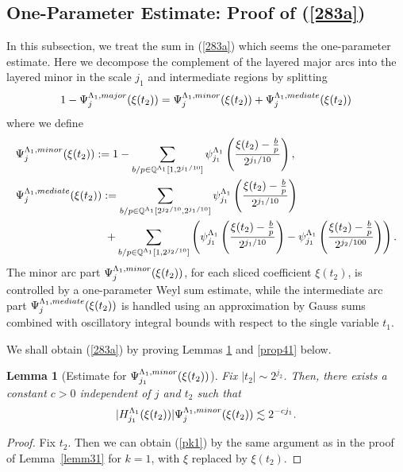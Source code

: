 \documentclass[10pt,a4paper]{amsart}
\newtheorem{lemma}{Lemma}\numberwithin{lemma}{section}
\numberwithin{equation}{section}
\begin{document}
\subsection{One-Parameter Estimate: Proof of (\ref{283a})}\label{Sec42v} In this subsection, we treat the sum in   (\ref{283a}) which seems the one-parameter estimate.
Here we decompose the complement of the layered major arcs into the layered minor in the scale $j_1$ and intermediate regions by splitting
$$  1-\Psi^{\Lambda_1,\rm{major}}_{j}(\xi(t_2))= \Psi^{\Lambda_1,\rm{minor}}_{j}(\xi(t_2)) +
\Psi^{\Lambda_1,\rm{mediate}}_{j}(\xi(t_2))  $$ 
where we define
\begin{align*} 
&\Psi^{\Lambda_1,\rm{minor}}_{j}(\xi(t_2)) :=1 -\sum_{b/p\in  \mathbb{Q}^{\Lambda_1}[1,2^{j_1/10}]}\psi^{\Lambda_1}_{j_1}\left(\frac{\xi(t_2)-\frac{b}{p}}{2^{j_1/10}}\right), \nonumber \\
&\Psi^{\Lambda_1,\rm{mediate}}_{j}(\xi(t_2)):=\sum_{b/p\in  \mathbb{Q}^{\Lambda_1}[2^{j_2/10},2^{j_1/10}]}\psi^{\Lambda_1}_{j_1}\left(\frac{\xi(t_2)-\frac{b}{p}}{2^{j_1/10}}\right) \nonumber \\
&\qquad\quad\qquad\qquad\quad+
\sum_{b/p\in  \mathbb{Q}^{\Lambda_1}[1,2^{j_2/10}]}
 \left( \psi^{\Lambda_1}_{j_1}\left(\frac{\xi(t_2)-\frac{b}{p}}{2^{j_1/10}}\right)-\psi^{\Lambda_1}_{j_1}\left(\frac{\xi(t_2)-\frac{b}{p}}{2^{j_2/100}}\right) \right).
    \end{align*}
The minor arc part $\Psi^{\Lambda_1,\rm{minor}}_{j}(\xi(t_2))$, for each sliced coefficient $\xi(t_2)$, is controlled by a one-parameter Weyl sum estimate, while the intermediate arc part $\Psi^{\Lambda_1,\rm{mediate}}_{j}(\xi(t_2))$ is handled using an approximation by Gauss sums combined with oscillatory integral bounds with respect to the single variable $t_1$.
 
 
  
   
We shall obtain (\ref{283a}) by proving Lemmas \ref{prop130} and \ref{prop41} below.
\begin{lemma}[Estimate for $\Psi^{\Lambda_1,\rm{minor}}_{j_1}(\xi(t_2))$]\label{prop130}
Fix $|t_2|\sim 2^{j_2}$.
Then, there exists a constant   $c>0$  independent of $j$ and $t_2$ such that
\begin{align}\label{pk1}
|H^{\Lambda_1}_{j_1}( \xi(t_2)) | \Psi^{\Lambda_1,\rm{minor}}_{j}(\xi(t_2))  \lesssim 2^{-c j_1}. 
\end{align}
\end{lemma}
\begin{proof}
Fix $t_2$. Then we can obtain (\ref{pk1}) by the same argument as in the proof of Lemma~\ref{lemm31} for $k=1$, with $\xi$ replaced by $\xi(t_2)$. \end{proof}
\end{document}
